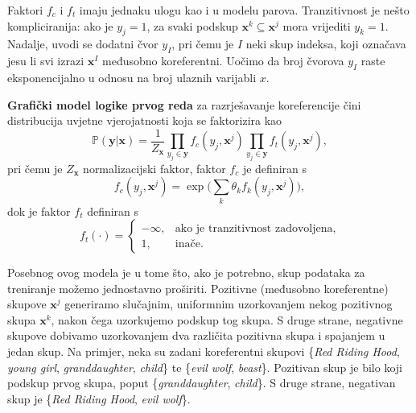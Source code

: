 \documentclass[a4paper,twoside,12pt]{memoir} %
\newcommand{\ti}[1]{\textit{#1\/}}
\newcommand{\tb}{\textbf}
\begin{document}
	Faktori $f_c$ i $f_t$ imaju jednaku ulogu kao i u modelu parova. Tranzitivnost je nešto kompliciranija: ako je $y_j = 1$, za svaki podskup $\mathbf{x}^k \subseteq \mathbf{x}^j$ mora vrijediti $y_k = 1$. Nadalje, uvodi se dodatni čvor $y_{I}$, pri čemu je $I$ neki skup indeksa, koji označava jesu li svi izrazi $\mathbf{x}^I$ međusobno koreferentni. Uočimo da broj čvorova $y_I$ raste eksponencijalno u odnosu na broj ulaznih varijabli $x$.

	\begin{defn}
		\tb{Grafički model logike prvog reda} za razrješavanje koreferencije čini distribucija uvjetne vjerojatnosti koja se faktorizira kao
		\begin{equation}\label{first_order_logic_graph}
		\mathbb{P}(\mathbf{y}| \mathbf{x}) =
		\frac{1}{Z_\mathbf{x}}
		\prod_{y_{j} \in \mathbf{y}} f_c(y_j, \mathbf{x}^j)
		\prod_{y_{j} \in \mathbf{y}} f_t(y_j, \mathbf{x}^j),
		\end{equation}
		pri čemu je ${Z_\mathbf{x}}$ normalizacijski faktor, faktor $f_c$ je definiran s
		\begin{equation*}
		f_c(y_j, \mathbf{x}^j) = \exp\bigg(\sum\limits_{k} \theta_k f_k(y_{j}, \mathbf{x}^j)\bigg),
		\end{equation*}
		dok je faktor $f_t$ definiran s
		\begin{equation*}
		f_t(\cdot) =
		\begin{cases}
		-\infty, 		& \text{ako je tranzitivnost zadovoljena}, \\
		1,              & \text{inače}.
		\end{cases}
		\end{equation*}
	\end{defn}

	\bigskip

	Posebnog ovog modela je u tome što, ako je potrebno, skup podataka za treniranje možemo jednostavno proširiti. Pozitivne (međusobno koreferentne) skupove $\mathbf{x}^j$ generiramo slučajnim, uniformnim uzorkovanjem nekog pozitivnog skupa $\mathbf{x}^k$, nakon čega uzorkujemo podskup tog skupa. S druge strane, negativne skupove dobivamo uzorkovanjem dva različita pozitivna skupa i spajanjem u jedan skup. Na primjer, neka su zadani koreferentni skupovi \{\ti{Red Riding Hood}, \ti{young girl}, \ti{granddaughter}, \ti{child}\} te \{\ti{evil wolf}, \ti{beast}\}. Pozitivan skup je bilo koji podskup prvog skupa, poput \{\ti{granddaughter}, \ti{child}\}. S druge strane, negativan skup je \{\ti{Red Riding Hood}, \ti{evil wolf}\}.
\end{document}
